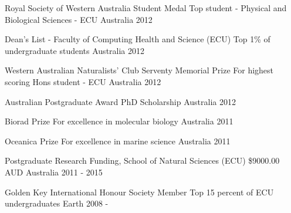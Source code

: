 
\begin{cvhonors}

  \cvhonor
    {Royal Society of Western Australia Student Medal} %
    {Top student - Physical and Biological Sciences - ECU} %
    {Australia} %
    {2012} %

  \cvhonor
    {Dean’s List - Faculty of Computing Health and Science (ECU)} %
    {Top 1\% of undergraduate students} %
    {Australia} %
    {2012} %

  \cvhonor
    {Western Australian Naturalists’ Club Serventy Memorial Prize} %
    {For highest scoring Hons student - ECU} %
    {Australia} %
    {2012} %

  \cvhonor
    {Australian Postgraduate Award} %
    {PhD Scholarship} %
    {Australia} %
    {2012} %

  \cvhonor
    {Biorad Prize} %
    {For excellence in molecular biology} %
    {Australia} %
    {2011} %
  
  \cvhonor
    {Oceanica Prize} %
    {For excellence in marine science} %
    {Australia} %
    {2011} %
  
  \cvhonor
    {Postgraduate Research Funding, School of Natural Sciences (ECU)} %
    {\$9000.00 AUD} %
    {Australia} %
    {2011 - 2015} %

  \cvhonor
    {Golden Key International Honour Society Member} %
    {Top 15 percent of ECU undergraduates} %
    {Earth} %
    {2008 - \infty} %
  
\end{cvhonors}
